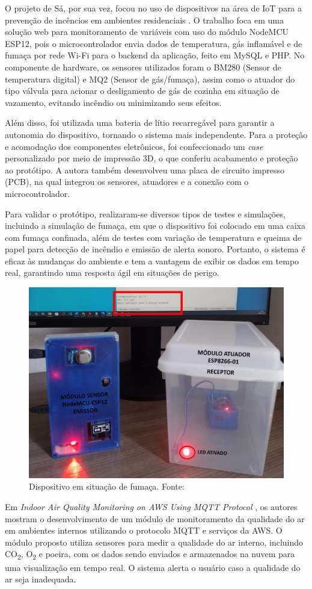 O projeto de Sá, por sua vez, focou no uso de dispositivos na área de IoT para a prevenção de incêncios em ambientes residenciais \cite{uea-iot-deteccao-incendio}. O trabalho 
foca em uma solução web para monitoramento de variáveis com uso do módulo NodeMCU ESP12, pois o microcontrolador envia dados de temperatura, gás inflamável e de 
fumaça por rede Wi-Fi para o backend da aplicação, feito em MySQL e PHP. No componente de hardware, os sensores utilizados foram o BM280 (Sensor de temperatura digital) e MQ2 (Sensor de gás/fumaça), assim como 
o atuador do tipo válvula para acionar o desligamento de gás de cozinha em situação de vazamento, evitando incêndio ou minimizando seus efeitos. 

Além disso, foi utilizada uma bateria de lítio recarregável para garantir a autonomia do dispositivo, tornando o sistema mais independente. Para a proteção e acomodação dos componentes eletrônicos, foi 
confeccionado um \textit{case} personalizado por meio de impressão 3D, o que conferiu acabamento e proteção ao protótipo. A autora também desenvolveu uma placa de circuito impresso (PCB), na qual integrou os sensores, atuadores e
a conexão com o microcontrolador.

Para validar o protótipo, realizaram-se diversos tipos de testes e simulações, incluindo a simulação de fumaça, em que o dispositivo foi colocado em uma caixa com 
fumaça confinada, além de testes com variação de temperatura e queima de papel para detecção de incêndio e emissão de alerta sonoro. Portanto, o sistema é eficaz às mudanças do ambiente e 
tem a vantagem de exibir os dados em tempo real, garantindo uma resposta ágil em situações de perigo. 

\begin{figure}[ht]
    \centering
    \includegraphics[width=.44\textwidth]{img/sa-dispositivo-simulacao.png}
    \caption{Dispositivo em situação de fumaça. Fonte:\cite{uea-iot-deteccao-incendio}}\label{figProtitpoUEA}
\end{figure}

Em \textit{Indoor Air Quality Monitoring on AWS Using MQTT Protocol} \cite{iot-monitoring-on-aws}, os autores mostram o desenvolvimento de 
um módulo de monitoramento da qualidade do ar em ambientes internos utilizando o protocolo MQTT e serviços da AWS. O módulo 
proposto utiliza sensores para medir a qualidade do ar interno, incluindo CO\textsubscript{2}, O\textsubscript{2} e poeira, com os dados sendo enviados e armazenados na 
nuvem para uma visualização em tempo real. O sistema alerta o usuário caso a qualidade do ar seja inadequada. 

